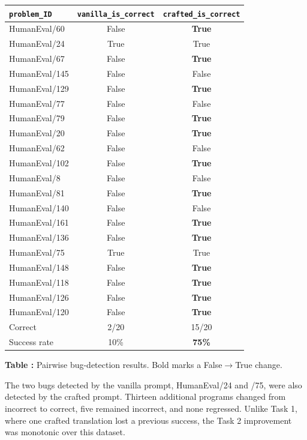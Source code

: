 \documentclass[sigconf,nonacm]{acmart}
\begin{document}
\begin{center}
\begin{minipage}{\columnwidth}\centering
\small
\setlength{\tabcolsep}{4pt}
\begin{tabular}{@{}lcc@{}}
\toprule
\texttt{problem\_ID} & \texttt{vanilla\_is\_correct} & \texttt{crafted\_is\_correct} \\
\midrule
HumanEval/60  & False & \textbf{True} \\
HumanEval/24  & True  & True          \\
HumanEval/67  & False & \textbf{True} \\
HumanEval/145 & False & False         \\
HumanEval/129 & False & \textbf{True} \\
HumanEval/77  & False & False         \\
HumanEval/79  & False & \textbf{True} \\
HumanEval/20  & False & \textbf{True} \\
HumanEval/62  & False & False         \\
HumanEval/102 & False & \textbf{True} \\
HumanEval/8   & False & False         \\
HumanEval/81  & False & \textbf{True} \\
HumanEval/140 & False & False         \\
HumanEval/161 & False & \textbf{True} \\
HumanEval/136 & False & \textbf{True} \\
HumanEval/75  & True  & True          \\
HumanEval/148 & False & \textbf{True} \\
HumanEval/118 & False & \textbf{True} \\
HumanEval/126 & False & \textbf{True} \\
HumanEval/120 & False & \textbf{True} \\
\midrule
Correct       & 2/20  & 15/20         \\
Success rate  & 10\%  & \textbf{75\%} \\
\bottomrule
\end{tabular}
\par\smallskip
{}\label{tab:mp3t2pairwise}\textbf{Table \thetable:}
Pairwise bug-detection results. Bold marks a False$\rightarrow$True change.
\end{minipage}
\end{center}

The two bugs detected by the vanilla prompt, HumanEval/24 and /75, were also
detected by the crafted prompt. Thirteen additional programs changed from
incorrect to correct, five remained incorrect, and none regressed. Unlike Task
1, where one crafted translation lost a previous success, the Task 2
improvement was monotonic over this dataset.
\end{document}

